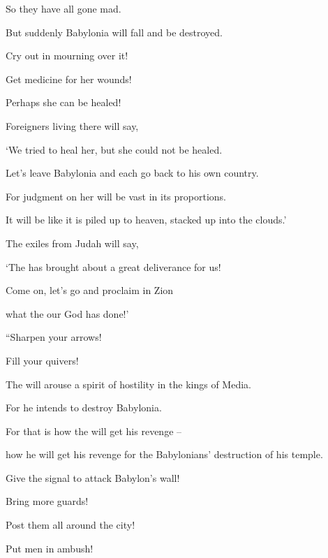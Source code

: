 {\par }{\Q So
they
have all gone mad.
\par }{\Q {}But suddenly
Babylonia
will fall
and be destroyed.
\par }{\Q Cry out
in mourning
over
it!
\par }{\Q Get medicine
for her wounds!
\par }{\Q Perhaps
she can be healed!
\par }{\Q {}Foreigners living there
will say,

\par }{\Q ‘We tried to
heal
her, but
she could not
be healed.
\par }{\Q Let’s
leave
Babylonia
and each
go back to
his own country.
\par }{\Q For
judgment
on her
will be vast
in its proportions.
\par }{\Q It will be like it is piled up to
heaven,
stacked
up into the clouds.’
\par }{\Q {}The
exiles from
Judah will say,

\par }{\Q ‘The
{}
has brought about a great deliverance
for us!

\par }{\Q Come
on, let’s go and proclaim
in Zion
\par }{\Q what the
{}
our God
has done!’
\par }{\Q {}“Sharpen
your arrows!
\par }{\Q Fill
your quivers!

\par }{\Q The
{}
will arouse
a spirit
of hostility in the kings
of Media.
\par }{\Q For
he intends
to destroy
Babylonia.
\par }{\Q For
that is how the
{}
will get his revenge
–
\par }{\Q how he will get his revenge
for the Babylonians’ destruction of his temple.
\par }{\Q {}Give the signal to attack
Babylon’s
wall!

\par }{\Q Bring
more guards!

\par }{\Q Post
them all around the city!

\par }{\Q Put
men in ambush!

}
